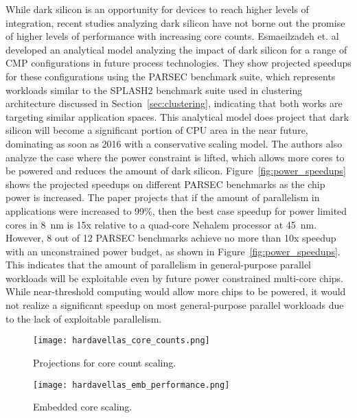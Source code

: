 While dark silicon is an opportunity for devices to reach higher levels of integration, recent studies analyzing dark silicon have not borne out the promise of higher levels of performance with increasing core counts.
Esmaeilzadeh et. al~\cite{Esmaeilzadeh2011Dark-silicon-an} developed an analytical model analyzing the impact of dark silicon for a range of CMP configurations in future process technologies.
They show projected speedups for these configurations using the PARSEC benchmark suite, which represents workloads similar to the SPLASH2 benchmark suite used in clustering architecture discussed in Section~\ref{sec:clustering}, indicating that both works are targeting similar application spaces.
This analytical model does project that dark silicon will become a significant portion of CPU area in the near future, dominating as soon as 2016 with a conservative scaling model.
The authors also analyze the case where the power constraint is lifted, which allows more cores to be powered and reduces the amount of dark silicon.
Figure~\ref{fig:power_speedups} shows the projected speedups on different PARSEC benchmarks as the chip power is increased.
The paper projects that if the amount of parallelism in applications were increased to 99\%, then the best case speedup for power limited cores in \SI{8}{\nano\meter} is 15x relative to a quad-core Nehalem processor at \SI{45}{\nano\meter}.
However, 8 out of 12 PARSEC benchmarks achieve no more than 10x speedup with an unconstrained power budget, as shown in Figure~\ref{fig:power_speedups}. 
This indicates that the amount of parallelism in general-purpose parallel workloads will be exploitable even by future power constrained multi-core chips.
While near-threshold computing would allow more chips to be powered, it would not realize a significant speedup on most general-purpose parallel workloads due to the lack of exploitable parallelism.

\begin{figure}[thpb]
\centering
\texttt{[image: hardavellas\_core\_counts.png]}
\caption{Projections for core count scaling.~\cite{Hardavellas:2011de}}
\label{fig:core_counts}
\end{figure}

\begin{figure}[thpb]
\centering
\texttt{[image: hardavellas\_emb\_performance.png]}
\caption{Embedded core scaling.~\cite{Hardavellas:2011de}}
\label{fig:emb_performance}
\end{figure}

